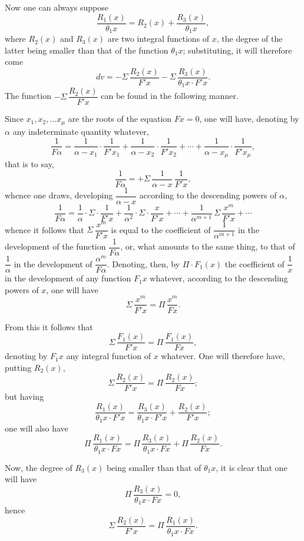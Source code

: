 \documentclass{article}
\begin{document}
Now one can always suppose
\[ \frac{R_1(x)}{\theta_1 x} = R_2(x) + \frac{R_3(x)}{\theta_1 x}, \]
where $R_2(x)$ and $R_3(x)$ are two integral functions of $x$, the degree of the latter being smaller than that of the function $\theta_1 x$; substituting, it will therefore come
\[ dv = -\Sigma\,\frac{R_2(x)}{F' x} - \Sigma\,\frac{R_3(x)}{\theta_1 x \cdot F' x}. \tag{27} \]
The function $-\Sigma\,\dfrac{R_2(x)}{F' x}$ can be found in the following manner.

Since $x_1, x_2, \ldots x_\mu$ are the roots of the equation $F x = 0$, one will have, denoting by $\alpha$ any indeterminate quantity whatever,
\[ \frac{1}{F\alpha} = \frac{1}{\alpha - x_1} \cdot \frac{1}{F' x_1} + \frac{1}{\alpha - x_2} \cdot \frac{1}{F' x_2} + \cdots + \frac{1}{\alpha - x_\mu} \cdot \frac{1}{F' x_\mu}, \]
that is to say,
\[ \frac{1}{F\alpha} = +\Sigma\,\frac{1}{\alpha - x}\,\frac{1}{F' x}, \tag{28} \]
whence one draws, developing $\dfrac{1}{\alpha - x}$ according to the descending powers of $\alpha$,
\[ \frac{1}{F\alpha} = \frac{1}{\alpha} \cdot \Sigma \cdot \frac{1}{F' x} + \frac{1}{\alpha^{2}} \cdot \Sigma \cdot \frac{x}{F' x} + \cdots + \frac{1}{\alpha^{m+1}}\,\Sigma\,\frac{x^{m}}{F' x} + \cdots \]
whence it follows that $\Sigma\,\dfrac{x^{m}}{F' x}$ is equal to the coefficient of $\dfrac{1}{\alpha^{m+1}}$ in the development of the function $\dfrac{1}{F\alpha}$, or, what amounts to the same thing, to that of $\dfrac{1}{\alpha}$ in the development of $\dfrac{\alpha^{m}}{F\alpha}$. Denoting, then, by $\Pi \cdot F_1(x)$ the coefficient of $\dfrac{1}{x}$ in the development of any function $F_1 x$ whatever, according to the descending powers of $x$, one will have
\[ \Sigma\,\frac{x^{m}}{F' x} = \Pi\,\frac{x^{m}}{F x}. \]

From this it follows that
\[ \Sigma\,\frac{F_1(x)}{F' x} = \Pi\,\frac{F_1(x)}{F x}, \]
denoting by $F_1 x$ any integral function of $x$ whatever. One will therefore have, putting $R_2(x)$,
\[ \Sigma\,\frac{R_2(x)}{F' x} = \Pi\,\frac{R_2(x)}{F x}; \tag{29} \]
but having
\[ \frac{R_1(x)}{\theta_1 x \cdot F' x} = \frac{R_3(x)}{\theta_1 x \cdot F' x} + \frac{R_2(x)}{F' x}; \]
one will also have
\[ \Pi\,\frac{R_1(x)}{\theta_1 x \cdot F x} = \Pi\,\frac{R_3(x)}{\theta_1 x \cdot F x} + \Pi\,\frac{R_2(x)}{F x}. \]

Now, the degree of $R_3(x)$ being smaller than that of $\theta_1 x$, it is clear that one will have
\[ \Pi\,\frac{R_3(x)}{\theta_1 x \cdot F x} = 0, \]
hence
\[ \Sigma\,\frac{R_2(x)}{F' x} = \Pi\,\frac{R_1(x)}{\theta_1 x \cdot F x}. \]
\end{document}
